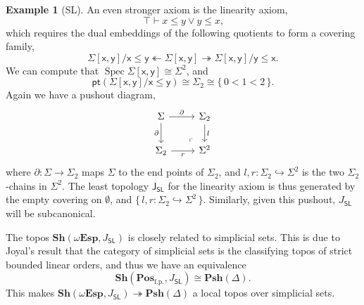 \documentclass[a4paper,12pt]{amsart}
\theoremstyle{definition}
\newtheorem{example}[theorem]{Example}
\newcommand{\mb}[1]{\mathbf{#1}}
\newcommand{\mr}[1]{\mathrm{#1}}
\newcommand{\ms}[1]{\mathsf{#1}}
\newcommand{\Pos}{\mb{Pos}}
\newcommand{\sh}{\mb{Sh}}
\newcommand{\psh}{\mb{Psh}}
\newcommand{\set}[1]{\{\,#1\,\}}
\newcommand{\surj}{\twoheadrightarrow}
\newcommand{\hook}{\hookrightarrow}
\newcommand{\fp}{_{\mr{f.p.}}}
\newcommand{\emp}{\emptyset}
\newcommand{\pt}{\ms{pt}}
\newcommand{\wTop}{\omega\mb{Esp}}
\newcommand{\spec}{\operatorname{Spec}}
\begin{document}
\begin{example}[SL]
  An even stronger axiom is the linearity axiom, 
  \[ \top \vdash x \le y \vee y \le x\text{,} \]
  which requires the dual embeddings of the following quotients to form a covering family,
  \[ \Sigma[\ms{x},\ms{y}]/\ms{x} \le \ms{y} \twoheadleftarrow \Sigma[\ms{x},\ms{y}] \surj \Sigma[\ms{x},\ms{y}]/\ms{y} \le \ms{x}\text{.} \]
  We can compute that $\spec \Sigma[\ms{x},\ms{y}] \cong \Sigma^2$, and 
  \[ \pt(\Sigma[\ms{x},\ms{y}]/\ms{x} \le \ms{y}) \cong \Sigma_2 \cong \set{0 < 1 < 2}\text{.} \]
  Again we have a pushout diagram,
  \[
  \begin{tikzcd}
    \Sigma \ar[r, "\partial"] \ar[d, "\partial"'] & \Sigma_2 \ar[d, "l"] \\ 
    \Sigma_2 \ar[r, "r"'] & \Sigma^2
    \arrow["\lrcorner"{anchor=center, pos=0.125, rotate=180}, draw=none, from=2-2, to=1-1]
  \end{tikzcd}
  \]
  where $\partial : \Sigma \to \Sigma_2$ maps $\Sigma$ to the end points of $\Sigma_2$, and $l,r : \Sigma_2 \hook \Sigma^2$ is the two $\Sigma_2$-chains in $\Sigma^2$. The least topology $\ms J_{\ms{SL}}$ for the linearity axiom is thus generated by the empty covering on $\emp$, and $\set{l,r : \Sigma_2 \hook \Sigma^2}$. Similarly, given this pushout, $J_{\ms{SL}}$ will be subcanonical.

  The topos $\sh(\wTop,J_{\ms{SL}})$ is closely related to simplicial sets. This is due to Joyal's result that the category of simplicial sets is the classifying topos of strict bounded linear orders, and thus we have an equivalence 
  \[ \sh(\Pos\fp,J_{\ms{SL}}) \cong \psh(\Delta)\text{.} \]
  This makes $\sh(\wTop,J_{\ms{SL}}) \surj \psh(\Delta)$ a local topos over simplicial sets.
\end{example}
\end{document}
